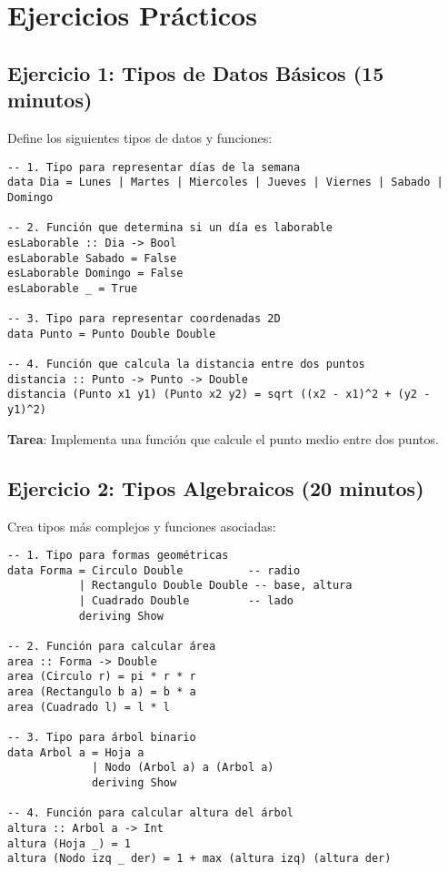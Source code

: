\documentclass[12pt]{article}
\begin{document}
\section{Ejercicios Prácticos}

\subsection{Ejercicio 1: Tipos de Datos Básicos (15 minutos)}

Define los siguientes tipos de datos y funciones:

\begin{lstlisting}
-- 1. Tipo para representar días de la semana
data Dia = Lunes | Martes | Miercoles | Jueves | Viernes | Sabado | Domingo

-- 2. Función que determina si un día es laborable
esLaborable :: Dia -> Bool
esLaborable Sabado = False
esLaborable Domingo = False
esLaborable _ = True

-- 3. Tipo para representar coordenadas 2D
data Punto = Punto Double Double

-- 4. Función que calcula la distancia entre dos puntos
distancia :: Punto -> Punto -> Double
distancia (Punto x1 y1) (Punto x2 y2) = sqrt ((x2 - x1)^2 + (y2 - y1)^2)
\end{lstlisting}

\textbf{Tarea}: Implementa una función que calcule el punto medio entre dos puntos.

\subsection{Ejercicio 2: Tipos Algebraicos (20 minutos)}

Crea tipos más complejos y funciones asociadas:

\begin{lstlisting}
-- 1. Tipo para formas geométricas
data Forma = Circulo Double          -- radio
           | Rectangulo Double Double -- base, altura
           | Cuadrado Double         -- lado
           deriving Show

-- 2. Función para calcular área
area :: Forma -> Double
area (Circulo r) = pi * r * r
area (Rectangulo b a) = b * a
area (Cuadrado l) = l * l

-- 3. Tipo para árbol binario
data Arbol a = Hoja a
             | Nodo (Arbol a) a (Arbol a)
             deriving Show

-- 4. Función para calcular altura del árbol
altura :: Arbol a -> Int
altura (Hoja _) = 1
altura (Nodo izq _ der) = 1 + max (altura izq) (altura der)
\end{lstlisting}
\end{document}
